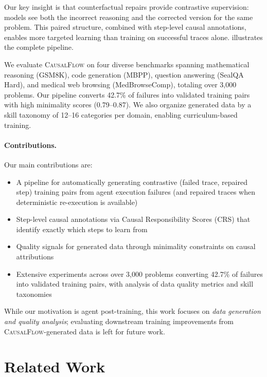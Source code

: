 \documentclass{article}
\theoremstyle{plain}
\theoremstyle{definition}
\theoremstyle{remark}
\begin{document}
Our key insight is that counterfactual repairs provide contrastive supervision: models see both the incorrect reasoning and the corrected version for the same problem. This paired structure, combined with step-level causal annotations, enables more targeted learning than training on successful traces alone.  illustrates the complete pipeline.

We evaluate \textsc{CausalFlow} on four diverse benchmarks spanning mathematical reasoning (GSM8K), code generation (MBPP), question answering (SealQA Hard), and medical web browsing (MedBrowseComp), totaling over 3{,}000 problems. Our pipeline converts 42.7\% of failures into validated training pairs with high minimality scores (0.79--0.87). We also organize generated data by a skill taxonomy of 12--16 categories per domain, enabling curriculum-based training.

\paragraph{Contributions.} Our main contributions are:
\begin{itemize}
    \item A pipeline for automatically generating contrastive (failed trace, repaired step) training pairs from agent execution failures (and repaired traces when deterministic re-execution is available)
    \item Step-level causal annotations via Causal Responsibility Scores (CRS) that identify exactly which steps to learn from
    \item Quality signals for generated data through minimality constraints on causal attributions
    \item Extensive experiments across over 3{,}000 problems converting 42.7\% of failures into validated training pairs, with analysis of data quality metrics and skill taxonomies
\end{itemize}

While our motivation is agent post-training, this work focuses on \emph{data generation and quality analysis}; evaluating downstream training improvements from \textsc{CausalFlow}-generated data is left for future work.


\section{Related Work}
\end{document}

